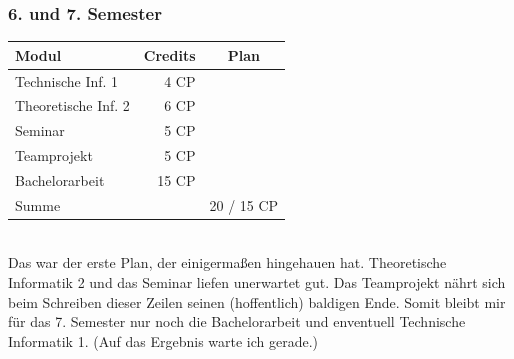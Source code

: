 \subsubsection*{6. und 7. Semester}
{
\footnotesize
\begin{tabular}{|l|r|c|}
\hline \textbf{Modul}		& \textbf{Credits} 	& \textbf{Plan} \\ 
\hline
\hline Technische Inf. 1 	& 4 CP 				& \nx 			\\ 
\hline Theoretische Inf. 2 	& 6 CP 				& \nx 			\\ 
\hline Seminar				& 5 CP 				& \nx 			\\ 
\hline Teamprojekt 			& 5 CP 				& \nx 			\\ 
\hline 
\hline Bachelorarbeit 		& 15 CP 			& \nx 			\\ 
\hline 
\hline Summe 				&  					& 20 / 15 CP 		\\ 
\hline 
\end{tabular}
}\\
Das war der erste Plan, der einigermaßen hingehauen hat. Theoretische
Informatik 2 und das Seminar liefen unerwartet gut. Das Teamprojekt
nährt sich beim Schreiben dieser Zeilen seinen (hoffentlich) baldigen
Ende. Somit bleibt mir für das 7. Semester nur noch die Bachelorarbeit
und enventuell Technische Informatik 1. (Auf das Ergebnis warte ich gerade.)

